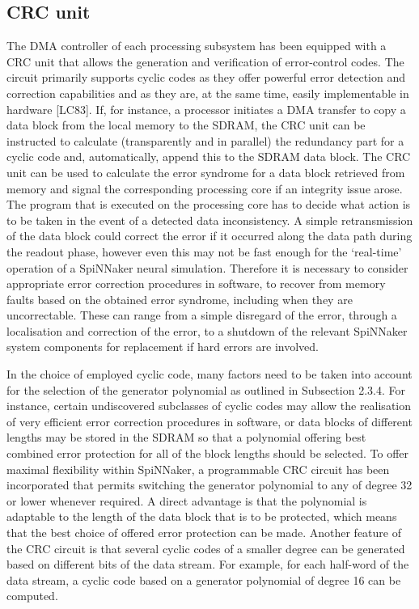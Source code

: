 \documentclass[oneside, a4paper, 11pt]{memoir}
\begin{document}
\subsection{CRC unit}
The DMA controller of each processing subsystem has been equipped with a CRC unit that allows the generation and verification of error-control codes. The circuit primarily supports cyclic codes as they offer powerful error detection and correction capabilities and as they are, at the same time, easily implementable in hardware [LC83]. If, for instance, a processor initiates a DMA transfer to copy a data block from the local memory to the SDRAM, the CRC unit can be instructed to calculate (transparently and in parallel) the redundancy part for a cyclic code and, automatically, append this to the SDRAM data block. The CRC unit can be used to calculate the error syndrome for a data block retrieved from memory and signal the corresponding processing core if an integrity issue arose. The program that is executed on the processing core has to decide what action is to be taken in the event of a detected data inconsistency. A simple retransmission of the data block could correct the error if it occurred along the data path during the readout phase, however even this may not be fast enough for the `real-time' operation of a SpiNNaker neural simulation. Therefore it is necessary to consider appropriate error correction procedures in software, to recover from memory faults based on the obtained error syndrome, including when they are uncorrectable. These can range from a simple disregard of the error, through a localisation and correction of the error, to a shutdown of the relevant SpiNNaker system components for replacement if hard errors are involved.

In the choice of employed cyclic code, many factors need to be taken into account for the selection of the generator polynomial as outlined in Subsection 2.3.4. For instance, certain undiscovered subclasses of cyclic codes may allow the realisation of very efficient error correction procedures in software, or data blocks of different lengths may be stored in the SDRAM so that a polynomial offering best combined error protection for all of the block lengths should be selected. To offer maximal flexibility within SpiNNaker, a programmable CRC circuit has been incorporated that permits switching the generator polynomial to any of degree 32 or lower whenever required. A direct advantage is that the polynomial is adaptable to the length of the data block that is to be protected, which means that the best choice of offered error protection can be made. Another feature of the CRC circuit is that several cyclic codes of a smaller degree can be generated based on different bits of the data stream. For example, for each half-word of the data stream, a cyclic code based on a generator polynomial of degree 16 can be computed.
\end{document}
